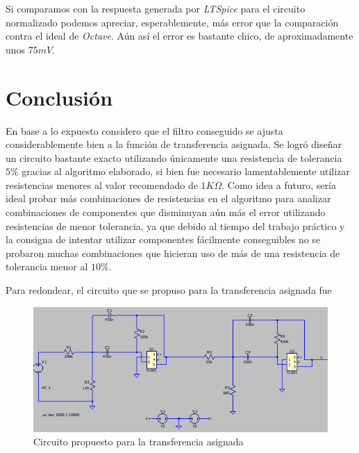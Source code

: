 \documentclass[11pt,a4paper]{report}
\begin{document}
Si comparamos con la respuesta generada por \textit{LTSpice} para el circuito normalizado podemos apreciar, esperablemente, más error que la comparación contra el ideal de \textit{Octave}. Aún así el error es bastante chico, de aproximadamente unos $75mV$.

\section*{Conclusión}

En base a lo expuesto considero que el filtro conseguido se ajusta considerablemente bien a la función de transferencia asignada. Se logró diseñar un circuito bastante exacto utilizando únicamente una resistencia de tolerancia $5\%$ gracias al algoritmo elaborado, si bien fue necesario lamentablemente utilizar resistencias menores al valor recomendado de $1K\Omega$. Como idea a futuro, sería ideal probar más combinaciones de resistencias en el algoritmo para analizar combinaciones de componentes que disminuyan aún más el error utilizando resistencias de menor tolerancia, ya que debido al tiempo del trabajo práctico y la consigna de intentar utilizar componentes fácilmente conseguibles no se probaron muchas combinaciones que hicieran uso de más de una resistencia de tolerancia menor al $10\%$.

\bigskip
Para redondear, el circuito que se propuso para la transferencia asignada fue

\vspace{5 mm}

\begin{figure}[h!]
\centering
\includegraphics[scale=1]{Circuito.png}
\caption{Circuito propuesto para la transferencia asignada}
\end{figure}
\end{document}
